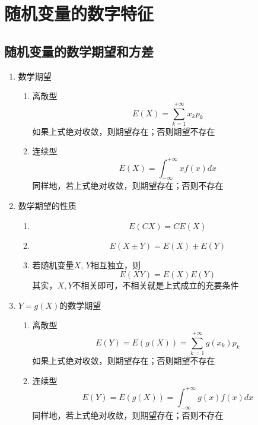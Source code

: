 \section{随机变量的数字特征}
\subsection{随机变量的数学期望和方差}
\begin{enumerate}
	\item 数学期望
	\begin{enumerate}
		\item 离散型
			\begin{equation}
				E(X) = \sum_{k=1}^{+\infty}x_kp_k
			\end{equation}
			如果上式绝对收敛，则期望存在；否则期望不存在
		\item 连续型
			\begin{equation}
				E(X) = \int_{-\infty}^{+\infty}xf(x)dx
			\end{equation}
			同样地，若上式绝对收敛，则期望存在；否则不存在
	\end{enumerate}

	\item 数学期望的性质
	\begin{enumerate}
		\item 
		\begin{equation}
			E(CX) = CE(X)
		\end{equation}
		\item 
		\begin{equation}
			E(X \pm Y) = E(X) \pm E(Y)
		\end{equation}
		\item 若随机变量$X$, $Y$相互独立，则
		\begin{equation}
			E(XY) = E(X)E(Y)
		\end{equation}
		其实，$X, Y$不相关即可，不相关就是上式成立的充要条件
	\end{enumerate}

	\item $Y=g(X)$的数学期望
	\begin{enumerate}
		\item 离散型
			\begin{equation}
				E(Y) = E(g(X)) = \sum_{k=1}^{+\infty} g(x_k)p_k
			\end{equation}
			如果上式绝对收敛，则期望存在；否则期望不存在
		\item 连续型
			\begin{equation}
				E(Y) = E(g(X)) = \int_{-\infty}^{+\infty}g(x)f(x)dx
			\end{equation}
			同样地，若上式绝对收敛，则期望存在；否则不存在
	\end{enumerate}


\end{enumerate}
